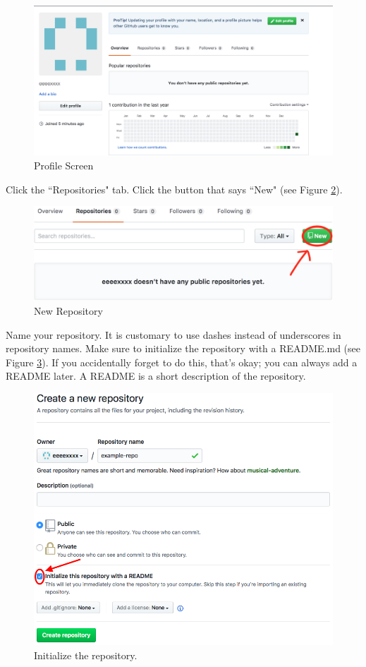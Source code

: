 \documentclass[11pt,a4paper]{article}
\begin{document}
\begin{figure}[h!]
\centering
\includegraphics[width=.7\textwidth]{figures/init_profile.png}
\caption{Profile Screen}
\label{fig:init-prof}
\end{figure}

Click the ``Repositories" tab.
Click the button that says ``New" (see Figure \ref{fig:new-repo}).

\begin{figure}[h!]
\centering
\includegraphics[width=.7\textwidth]{figures/new_repo.png}
\caption{New Repository}
\label{fig:new-repo}
\end{figure}

Name your repository.
It is customary to use dashes instead of underscores in repository names.
Make sure to initialize the repository with a README.md (see Figure \ref{fig:init-repo}).
If you accidentally forget to do this, that's okay; you can always add a README later.
A README is a short description of the repository.

\begin{figure}[h!]
\centering
\includegraphics[width=.7\textwidth]{figures/init_repo.png}
\caption{Initialize the repository.}
\label{fig:init-repo}
\end{figure}
\end{document}
